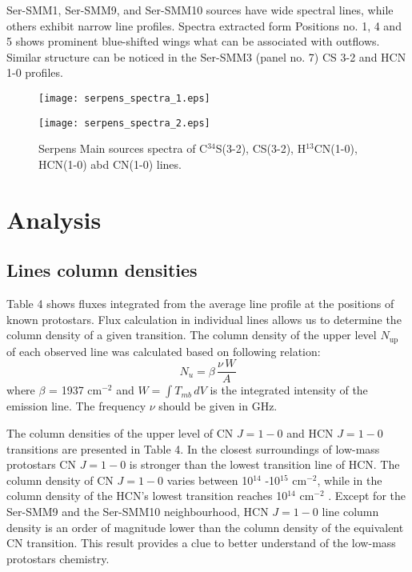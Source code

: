 \documentclass{aa}
\begin{document}
Ser-SMM1, Ser-SMM9, and Ser-SMM10 sources have wide spectral lines, while others exhibit narrow line profiles. Spectra extracted form Positions no. 1, 4 and 5 shows prominent blue-shifted wings what can be associated with outflows. Similar structure can be noticed in the Ser-SMM3 (panel no. 7) CS 3-2 and HCN 1-0 profiles. 


\begin{figure*}
   \centering
   \texttt{[image: serpens\_spectra\_1.eps]}
         \label{Spectra_1}
   \end{figure*}
\begin{figure*}
   \centering
   \texttt{[image: serpens\_spectra\_2.eps]}
      \caption{Serpens Main sources spectra of C$^{34}$S(3-2), CS(3-2), H$^{13}$CN(1-0), HCN(1-0) abd CN(1-0) lines.}
         \label{Spectra_1}
   \end{figure*}

\section{Analysis}

\subsection{Lines column densities}

Table 4 shows fluxes integrated from the average line profile at the positions of known protostars. 
Flux calculation in individual lines allows us to determine the column density of a given transition. The column density of the upper level $N_\mathrm{up}$ of each observed line was calculated based on following relation:
\begin{equation} \label{eq1}
N_u = \beta \, \frac{\nu \, W}{A}
\end{equation}
where $\beta$ = 1937 cm$^{-2}$ and $W = \int{T_{mb} \, dV}$ is the integrated intensity of the emission line. The frequency $\nu$ should be given in GHz.

The column densities of the upper level of CN $J=1-0$ and HCN $J=1-0$ transitions are presented in Table 4. In the closest surroundings of low-mass protostars CN $J=1-0$ is stronger than the lowest transition line of HCN. The column density of CN $J=1-0$ varies between 10$^{14}$ -10$^{15}$ cm$^{-2}$, while in the column density of the HCN’s lowest transition reaches 10$^{14}$ cm$^{-2}$ . Except for the Ser-SMM9 and the Ser-SMM10 neighbourhood, HCN $J=1-0$ line column density is an order of magnitude lower than the column density of the equivalent CN transition. This result provides a clue to better understand of the low-mass protostars chemistry.  
\end{document}
